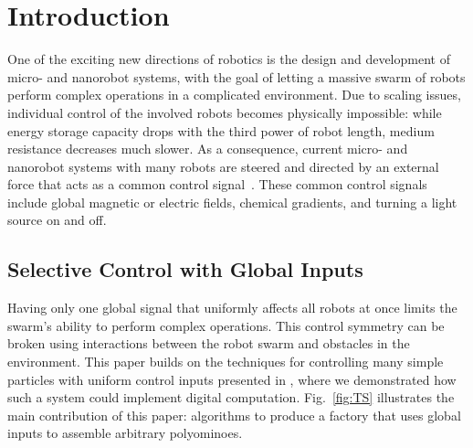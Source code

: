 \section{Introduction}\label{sec:Intro}

One of the exciting new directions of robotics is the design and development
of micro- and nanorobot systems, with the goal of letting a massive swarm of robots
perform complex operations in a complicated environment. Due to scaling 
issues, individual control of the involved robots becomes physically impossible:
while energy storage capacity drops with the third power of robot length,
medium resistance decreases much slower. As a consequence,
current micro- and nanorobot systems with many robots are steered and
directed by an external force that acts as a common control signal~\cite{Donald2013,Chiang2011,Hsi-Wen2012,Diller2013,Jing2013,Ou2013,Lanauze2013}.
These common control signals include global magnetic or electric fields,
chemical gradients, and turning a light source on and off.  

 \subsection{Selective Control with Global Inputs}
Having only one global signal that uniformly affects all robots at once
limits the swarm's ability to perform complex operations.
This control symmetry can be broken using interactions between the robot swarm
and obstacles in the environment. 
This paper builds on the techniques for controlling many simple particles with uniform control inputs presented in \cite{Becker2013f,Becker2014,Becker2014a}, where
we demonstrated how such a system could  implement digital computation.
Fig.~\ref{fig:TS} illustrates the main contribution of this paper: algorithms to produce a factory that uses global inputs to assemble arbitrary polyominoes.







